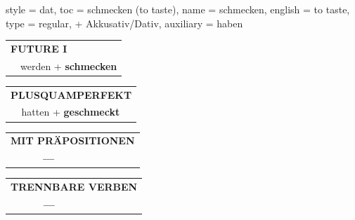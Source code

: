 \begin{verbentry}{
  style = {dat},
  toc = {schmecken (to taste)},
  name = {schmecken},
  english = {to taste},
  type = {regular, + Akkusativ/Dativ},
  auxiliary = {haben}
}
\begin{tabular}{rl}
    \multicolumn{2}{l}{\textbf{FUTURE I} }\\
  &  werden + \textbf{schmecken}\\
 
  \end{tabular}
\hfill
   \begin{tabular}{rl}
      \multicolumn{2}{l}{\textbf{PLUSQUAMPERFEKT}}\\
  &  hatten + \textbf{geschmeckt}\\
  \end{tabular}
  
  
\vspace{10pt}

\begin{tabular}{lll}
\multicolumn{3}{l}{\textbf{MIT PRÄPOSITIONEN}}\\
& \textbf{---} & \\
\end{tabular}
\hfill
\begin{tabular}{lll}
\multicolumn{3}{l}{\textbf{TRENNBARE VERBEN}}\\
& \textbf{---} & \\
\end{tabular}
\vspace{-5pt}
\end{verbentry}

